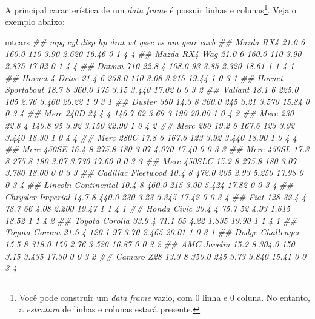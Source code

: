 \documentclass[]{book}
\newenvironment{Shaded}{\begin{snugshade}}{\end{snugshade}}
\newcommand{\CommentTok}[1]{\textcolor[rgb]{0.56,0.35,0.01}{\textit{#1}}}
\newcommand{\NormalTok}[1]{#1}
\begin{document}
A principal característica de um \emph{data frame} é possuir linhas e colunas\footnote{Você pode construir um \emph{data frame} vazio, com 0 linha e 0 coluna. No entanto, a \emph{estrutura} de linhas e colunas estará presente.}. Veja o exemplo abaixo:

\begin{Shaded}
\begin{Highlighting}[]
\NormalTok{mtcars}
\CommentTok{##                      mpg cyl  disp  hp drat    wt  qsec vs am gear carb}
\CommentTok{## Mazda RX4           21.0   6 160.0 110 3.90 2.620 16.46  0  1    4    4}
\CommentTok{## Mazda RX4 Wag       21.0   6 160.0 110 3.90 2.875 17.02  0  1    4    4}
\CommentTok{## Datsun 710          22.8   4 108.0  93 3.85 2.320 18.61  1  1    4    1}
\CommentTok{## Hornet 4 Drive      21.4   6 258.0 110 3.08 3.215 19.44  1  0    3    1}
\CommentTok{## Hornet Sportabout   18.7   8 360.0 175 3.15 3.440 17.02  0  0    3    2}
\CommentTok{## Valiant             18.1   6 225.0 105 2.76 3.460 20.22  1  0    3    1}
\CommentTok{## Duster 360          14.3   8 360.0 245 3.21 3.570 15.84  0  0    3    4}
\CommentTok{## Merc 240D           24.4   4 146.7  62 3.69 3.190 20.00  1  0    4    2}
\CommentTok{## Merc 230            22.8   4 140.8  95 3.92 3.150 22.90  1  0    4    2}
\CommentTok{## Merc 280            19.2   6 167.6 123 3.92 3.440 18.30  1  0    4    4}
\CommentTok{## Merc 280C           17.8   6 167.6 123 3.92 3.440 18.90  1  0    4    4}
\CommentTok{## Merc 450SE          16.4   8 275.8 180 3.07 4.070 17.40  0  0    3    3}
\CommentTok{## Merc 450SL          17.3   8 275.8 180 3.07 3.730 17.60  0  0    3    3}
\CommentTok{## Merc 450SLC         15.2   8 275.8 180 3.07 3.780 18.00  0  0    3    3}
\CommentTok{## Cadillac Fleetwood  10.4   8 472.0 205 2.93 5.250 17.98  0  0    3    4}
\CommentTok{## Lincoln Continental 10.4   8 460.0 215 3.00 5.424 17.82  0  0    3    4}
\CommentTok{## Chrysler Imperial   14.7   8 440.0 230 3.23 5.345 17.42  0  0    3    4}
\CommentTok{## Fiat 128            32.4   4  78.7  66 4.08 2.200 19.47  1  1    4    1}
\CommentTok{## Honda Civic         30.4   4  75.7  52 4.93 1.615 18.52  1  1    4    2}
\CommentTok{## Toyota Corolla      33.9   4  71.1  65 4.22 1.835 19.90  1  1    4    1}
\CommentTok{## Toyota Corona       21.5   4 120.1  97 3.70 2.465 20.01  1  0    3    1}
\CommentTok{## Dodge Challenger    15.5   8 318.0 150 2.76 3.520 16.87  0  0    3    2}
\CommentTok{## AMC Javelin         15.2   8 304.0 150 3.15 3.435 17.30  0  0    3    2}
\CommentTok{## Camaro Z28          13.3   8 350.0 245 3.73 3.840 15.41  0  0    3    4}

\end{Highlighting}
\end{Shaded}
\end{document}
